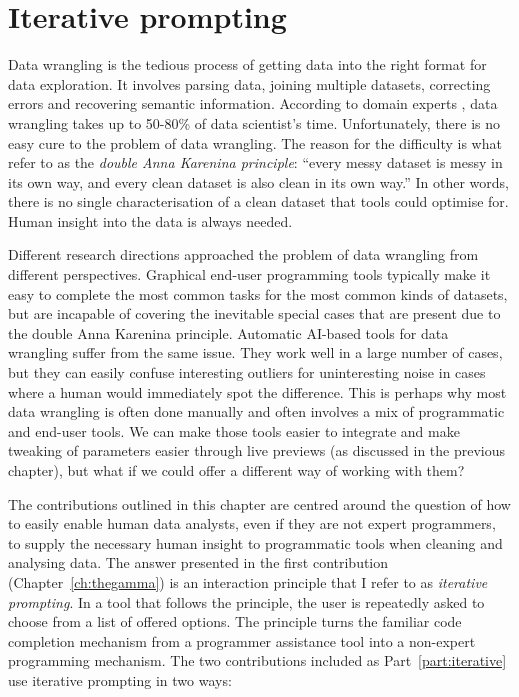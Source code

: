 \documentclass[fleqn,11pt]{report}
\theoremstyle{definition}
\begin{document}

\chapter{Iterative prompting}
\label{ch:iterative}

Data wrangling is the tedious process of getting data into the right format for data exploration.
It involves parsing data, joining multiple datasets, correcting errors and recovering semantic
information. According to domain experts \citep{rattenbury-2017-wrangling}, data wrangling
takes up to 50-80\% of data scientist's time. Unfortunately, there is no easy cure to the problem
of data wrangling. The reason for the difficulty is what \cite{gerrit-2019-csv} refer to
as the \emph{double Anna Karenina principle}: ``every messy dataset is messy in its own way, and
every clean dataset is also clean in its own way.'' In other words, there is no single
characterisation of a clean dataset that tools could optimise for. Human insight into the data
is always needed.

Different research directions approached the problem of data wrangling from different perspectives.
Graphical end-user programming tools typically make it easy to complete the
most common tasks for the most common kinds of datasets, but are incapable of covering the
inevitable special cases that are present due to the double Anna Karenina principle.
Automatic AI-based tools for data wrangling suffer from the same issue. They work well in a
large number of cases, but they can easily confuse interesting outliers for uninteresting
noise in cases where a human would immediately spot the difference. This is perhaps why most
data wrangling is often done manually and often involves a mix of programmatic and end-user
tools. We can make those tools easier to integrate and make tweaking of parameters easier through
live previews (as discussed in the previous chapter), but what if we could offer a different way
of working with them?

The contributions outlined in this chapter are centred around the question of how to
easily enable human data analysts, even if they are not expert programmers, to supply the
necessary human insight to programmatic tools when cleaning and analysing data.
The answer presented in the first contribution (Chapter~\ref{ch:thegamma}) is
an interaction principle that I refer to as \emph{iterative prompting}. In a tool that
follows the principle, the user is repeatedly asked to choose from a list of offered options.
The principle turns the familiar code completion mechanism from a programmer assistance tool
into a non-expert programming mechanism. The two contributions included as Part~\ref{part:iterative}
use iterative prompting in two ways:
\end{document}
